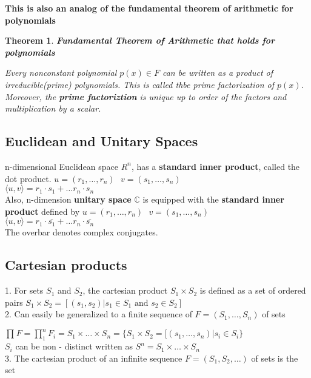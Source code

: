 \documentclass[12pt]{article}
\newcommand{\CC}{\mathbb{C}}
\newtheorem{theorem}{Theorem}
\begin{document}
\textbf{This is also an analog of the fundamental theorem of arithmetic for polynomials}

\begin{theorem}
\textbf{Fundamental Theorem of Arithmetic that holds for polynomials}

Every nonconstant polynomial $p(x) \in F$ can be written as a product  of irreducible(prime) polynomials. This is called thbe prime factorization of $p(x)$. Moreover, the \textbf{prime factoriztion} is unique up to order of the factors and multiplication by a scalar.
\end{theorem}

\subsection{Euclidean and Unitary Spaces}
n-dimensional Euclidean space $R^{n}$, has a \textbf{standard inner product}, called the dot product.
\( u = (r_1, \ldots , r_n) \text{ } v = (s_1, \ldots , s_n)\)\\
\(\langle u,v \rangle = r_1\cdot s_1 + \ldots r_n \cdot s_n\)\\

Also, n-dimension \textbf{unitary space} $\CC$ is equipped with the \textbf{standard inner product} defined by 
\( u = (r_1, \ldots , r_n) \text{ } v = (s_1, \ldots , s_n)\)\\
\(\langle u,v \rangle = r_1\cdot \overline{s_1} + \ldots r_n \cdot \overline{s_n}\)\\
The overbar denotes complex conjugates.

\subsection{Cartesian products}
1. For sets $S_1$ and $S_2$, the cartesian product $S_1 \times S_2$ is defined as a set of ordered pairs
\(S_1 \times S_2 = [{(s_1, s_2)| s_1 \in S_1\text{ and } s_2 \in S_2}]\)\\

2. Can easily be generalized to a finite sequence of $F = (S_1, \ldots , S_n)$ of sets

\(\prod_{}^{}F = \prod_{1}^{n}F_i = S_1 \times \ldots \times S_n = \{S_1 \times S_2 = [(s_1,\ldots , s_n)| s_i \in S_i\} \)\\
$S_i$ can be non - distinct written as \(S^n = S_1 \times \ldots \times S_n  \)\\

3. The cartesian product of an infinite sequence $F= (S_1, S_2, \ldots)$ of sets is the set \\
\end{document}
